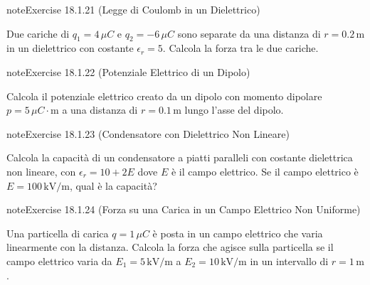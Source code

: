 \documentclass[letterpaper,10pt,italian]{jupyterBook}
\begin{document}
\begin{sphinxadmonition}{note}{Exercise 18.1.21 (Legge di Coulomb in un Dielettrico)}



\sphinxAtStartPar
Due cariche di \(q_1 = 4 \, \mu C\) e \(q_2 = -6 \, \mu C\) sono separate da una distanza di \(r = 0.2 \, \text{m}\) in un dielettrico con costante \(\epsilon_r = 5\). Calcola la forza tra le due cariche.
\end{sphinxadmonition}
 \label{exercise:ch/electromagnetism/electrostatics-problems-exercise-21}

\begin{sphinxadmonition}{note}{Exercise 18.1.22 (Potenziale Elettrico di un Dipolo)}



\sphinxAtStartPar
Calcola il potenziale elettrico creato da un dipolo con momento dipolare \(p = 5 \, \mu C \cdot \text{m}\) a una distanza di \(r = 0.1 \, \text{m}\) lungo l’asse del dipolo.
\end{sphinxadmonition}
 \label{exercise:ch/electromagnetism/electrostatics-problems-exercise-22}

\begin{sphinxadmonition}{note}{Exercise 18.1.23 (Condensatore con Dielettrico Non Lineare)}



\sphinxAtStartPar
Calcola la capacità di un condensatore a piatti paralleli con costante dielettrica non lineare, con \(\epsilon_r = 10 + 2E\) dove \(E\) è il campo elettrico. Se il campo elettrico è \(E = 100 \, \text{kV/m}\), qual è la capacità?
\end{sphinxadmonition}
 \label{exercise:ch/electromagnetism/electrostatics-problems-exercise-23}

\begin{sphinxadmonition}{note}{Exercise 18.1.24 (Forza su una Carica in un Campo Elettrico Non Uniforme)}



\sphinxAtStartPar
Una particella di carica \(q = 1 \, \mu C\) è posta in un campo elettrico che varia linearmente con la distanza. Calcola la forza che agisce sulla particella se il campo elettrico varia da \(E_1 = 5 \, \text{kV/m}\) a \(E_2 = 10 \, \text{kV/m}\) in un intervallo di \(r = 1 \, \text{m}\).
\end{sphinxadmonition}
 \label{exercise:ch/electromagnetism/electrostatics-problems-exercise-24}
\end{document}

